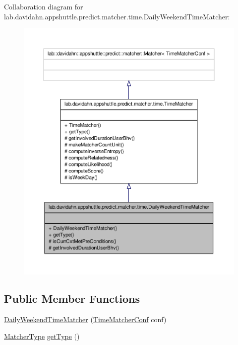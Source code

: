 \-Collaboration diagram for lab.\-davidahn.\-appshuttle.\-predict.\-matcher.\-time.\-Daily\-Weekend\-Time\-Matcher\-:
\nopagebreak
\begin{figure}[H]
\begin{center}
\leavevmode
\includegraphics[width=350pt]{classlab_1_1davidahn_1_1appshuttle_1_1predict_1_1matcher_1_1time_1_1_daily_weekend_time_matcher__coll__graph}
\end{center}
\end{figure}
\subsection*{\-Public \-Member \-Functions}
\begin{DoxyCompactItemize}
\item 
\hyperlink{classlab_1_1davidahn_1_1appshuttle_1_1predict_1_1matcher_1_1time_1_1_daily_weekend_time_matcher_af7faaa956fe81488e10165352fa18086}{\-Daily\-Weekend\-Time\-Matcher} (\hyperlink{classlab_1_1davidahn_1_1appshuttle_1_1predict_1_1matcher_1_1time_1_1_time_matcher_conf}{\-Time\-Matcher\-Conf} conf)
\item 
\hyperlink{enumlab_1_1davidahn_1_1appshuttle_1_1predict_1_1matcher_1_1_matcher_type}{\-Matcher\-Type} \hyperlink{classlab_1_1davidahn_1_1appshuttle_1_1predict_1_1matcher_1_1time_1_1_daily_weekend_time_matcher_a142bbddf03bd016ab3617f8782bf0da1}{get\-Type} ()
\end{DoxyCompactItemize}
